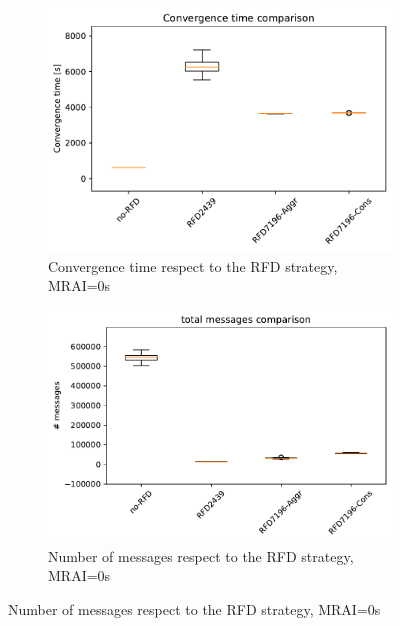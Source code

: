 \begin{figure}[H]
     \centering
     \begin{subfigure}[b]{0.325\textwidth}
         \centering
         \includegraphics[width=\textwidth]{images/RFD/miceVSelephants/MultiMRAI/0/elephants/cisco_1000MRAI0_rfd_comparison_time_boxplot.pdf}
         \caption{Convergence time respect to the RFD strategy, MRAI=0s}
         \label{fig:1000_RFD_MRAI30_time_elephant}
     \end{subfigure}
     \hfill
     \begin{subfigure}[b]{0.325\textwidth}
         \centering
         \includegraphics[width=\textwidth]{images/RFD/miceVSelephants/MultiMRAI/0/elephants/cisco_1000MRAI0_rfd_comparison_messages_boxplot.pdf}
         \caption{Number of messages respect to the RFD strategy, MRAI=0s}
         \label{fig:1000_RFD_MRAI30_messages_elephant}

\end{subfigure}
\end{figure}

